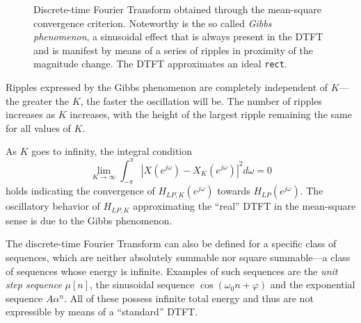 \documentclass[\documentfontsize, twocolumn]{\classname}
\begin{document}
\begin{figure*}[ht]
\begin{center}
\end{center}\caption{Discrete-time Fourier Transform obtained through the mean-square convergence criterion. Noteworthy is the so called \emph{Gibbs phenomenon}, a sinusoidal effect that is always present in the DTFT and is manifest by means of a series of ripples in proximity of the magnitude change. The DTFT approximates an ideal \texttt{rect}.}\label{tikz:discreteTimeFourierTransformExampleSinc}
\end{figure*}
Ripples expressed by the Gibbs phenomenon are completely independent of $K$---the greater the $K$, the faster the oscillation will be. The number of ripples increases as $K$ increases, with the height of the largest ripple remaining the same for all values of $K$.

As $K$ goes to infinity, the integral condition
\[
    \lim_{K\rightarrow \infty}\int_{-\pi}^\pi \left|X(e^{j\omega}) - X_K(e^{j\omega})\right|^2 d\omega = 0
\]
holds indicating the convergence of $H_{LP,K}(e^{j\omega})$ towards $H_{LP}(e^{j\omega})$. The oscillatory behavior of $H_{LP,K}$ approximating the ``real'' DTFT in the mean-square sense is due to the Gibbs phenomenon.

The discrete-time Fourier Transform can also be defined for a specific class of sequences, which are neither absolutely summable nor square summable---a class of sequences whose energy is infinite. Examples of such sequences are the \emph{unit step sequence} $\mu[n]$, the sinusoidal sequence $\cos{(\omega_0 n + \varphi)}$ and the exponential sequence $A\alpha^n$. All of these possess infinite total energy and thus are not expressible by means of a ``standard'' DTFT.
\end{document}
